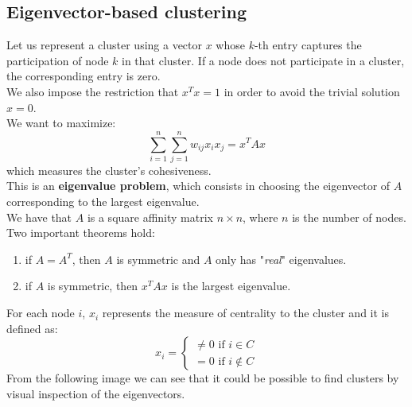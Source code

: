 \subsection{Eigenvector-based clustering}
Let us represent a cluster using a vector $x$ whose $k$-th entry captures the participation of node $k$ in that cluster. If a node does not participate in a cluster, the corresponding entry is zero.\\
We also impose the restriction that $x^Tx = 1$ in order to avoid the trivial solution $x=0$.\\
We want to maximize:
$$\sum_{i=1}^n \sum_{j=1}^n w_{ij} x_i x_j = x^TAx$$
which measures the cluster's cohesiveness.\\
This is an \textbf{eigenvalue problem}, which consists in choosing the eigenvector of $A$ corresponding to the largest eigenvalue.\\
We have that $A$ is a square affinity matrix $n \times n$, where $n$ is the number of nodes. Two important theorems hold:
\begin{enumerate}
	\item if $A = A^T$, then $A$ is symmetric and $A$ only has "\textit{real}" eigenvalues.
	\item if $A$ is symmetric, then $x^TAx$ is the largest eigenvalue. 
\end{enumerate}
For each node $i$, $x_i$ represents the measure of centrality to the cluster and it is defined as:
$$x_i = \begin{cases}
\neq 0 \text{  if } i \in C\\
= 0 \text{  if } i \notin C
\end{cases}$$
From the following image we can see that it could be possible to find clusters by visual inspection of the eigenvectors.

